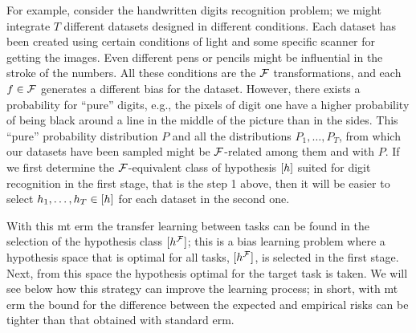 For example, consider the handwritten digits recognition problem; we might integrate $T$ different datasets designed in different conditions. Each dataset has been created using certain conditions of light and some specific scanner for getting the images. Even different pens or pencils might be influential in the stroke of the numbers. All these conditions are the $\mathcal{F}$ transformations, and each $f \in \mathcal{F}$ generates a different bias for the dataset. However, there exists a probability for ``pure'' digits, e.g., the pixels of digit one have a higher probability of being black around a line in the middle of the picture than in the sides. This ``pure'' probability distribution $P$ and all the distributions $P_1, \ldots, P_T$, from which our datasets have been sampled might be $\mathcal{F}$-related among them and with $P$. If we first determine the $\mathcal{F}$-equivalent class of hypothesis $\lbrack h\rbrack$ suited for digit recognition in the first stage, that is the step 1 above, then it will be easier to select $h_1, \ldots, h_T \in \lbrack h\rbrack$ for each dataset in the second one.

%
With this \acrshort{mt} \acrshort{erm} the transfer learning between tasks can be found in the selection of the hypothesis class $\lbrack h^{\mathcal{F}}\rbrack$; this is a bias learning problem where a hypothesis space that is optimal for all tasks, $\lbrack h^{\mathcal{F}}\rbrack$, is selected in the first stage. Next, from this space the hypothesis optimal for the target task is taken.
%
We will see below how this strategy can improve the learning process; in short, with \acrshort{mt} \acrshort{erm} the bound for the difference between the expected and empirical risks can be tighter than that obtained with standard \acrshort{erm}. 



